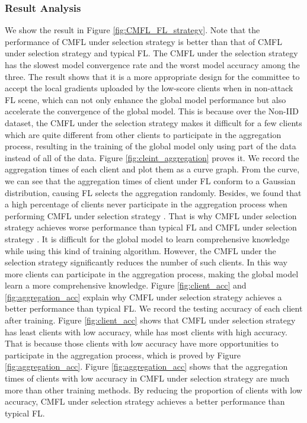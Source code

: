 \documentclass[10pt,journal,compsoc]{IEEEtran}
\begin{document}
\subsubsection{Result Analysis}


We show the result in Figure \ref{fig:CMFL_FL_strategy}. Note that the performance of CMFL under selection strategy \uppercase\expandafter{} is better than that of CMFL under selection strategy \uppercase\expandafter{} and typical FL. The CMFL under the selection strategy \uppercase\expandafter{} has the slowest model convergence rate and the worst model accuracy among the three. The result shows that it is a more appropriate design for the committee to accept the local gradients uploaded by the low-score clients when in non-attack FL scene, which can not only enhance the global model performance but also accelerate the convergence of the global model. This is because over the Non-IID dataset, the CMFL under the selection strategy \uppercase\expandafter{} makes it difficult for a few clients which are quite different from other clients to participate in the aggregation process, resulting in the training of the global model only using part of the data instead of all of the data. {Figure \ref{fig:cleint_aggregation} proves it. We record the aggregation times of each client and plot them as a curve graph. From the curve, we can see that the aggregation times of client under FL conform to a Gaussian distribution, causing FL selects the aggregation randomly. Besides, we found that a high percentage of clients never participate in the aggregation process when performing CMFL under selection strategy \uppercase\expandafter{}. That is why CMFL under selection strategy \uppercase\expandafter{} achieves worse performance than typical FL and CMFL under selection strategy \uppercase\expandafter{}. It is difficult for the global model to learn comprehensive knowledge while using this kind of training algorithm. However, the CMFL under the selection strategy \uppercase\expandafter{} significantly reduces the number of such clients. In this way more clients can participate in the aggregation process, making the global model learn a more comprehensive knowledge. Figure \ref{fig:client_acc} and \ref{fig:aggregation_acc} explain why CMFL under selection strategy \uppercase\expandafter{} achieves a better performance than typical FL. We record the testing accuracy of each client after training. Figure \ref{fig:client_acc} shows that CMFL under selection strategy \uppercase\expandafter{} has least clients with low accuracy, while has most clients with high accuracy. That is because those clients with low accuracy have more opportunities to participate in the aggregation process, which is proved by Figure \ref{fig:aggregation_acc}. Figure \ref{fig:aggregation_acc} shows that the aggregation times of clients with low accuracy in CMFL under selection strategy \uppercase\expandafter{} are much more than other training methods. By reducing the proportion of clients with low accuracy, CMFL under selection strategy \uppercase\expandafter{} achieves a better performance than typical FL. } 
\end{document}
